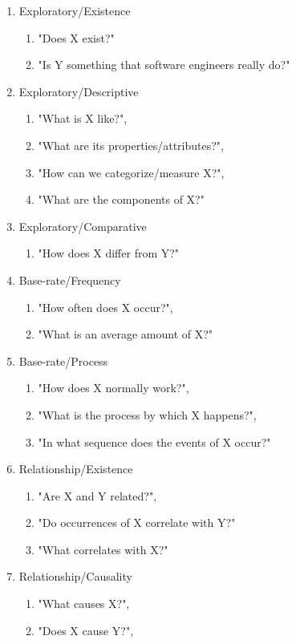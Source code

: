 \documentclass[conference, compsoc, twoside]{IEEEtran}
\begin{document}
\begin{enumerate}
	\item Exploratory/Existence 
	\begin{enumerate}
		\item "Does X exist?" 
		\item "Is Y something that software engineers really do?"
	\end{enumerate}
	\item Exploratory/Descriptive 
	\begin{enumerate}
		\item "What is X like?",
		\item "What are its properties/attributes?",
		\item "How can we categorize/measure X?",
		\item "What are the components of X?"
	\end{enumerate}
	\item Exploratory/Comparative 
	\begin{enumerate}
		\item "How does X differ from Y?"
	\end{enumerate}
	\item Base-rate/Frequency 
	\begin{enumerate}
		\item "How often does X occur?",
		\item "What is an average amount of X?"
	\end{enumerate}
	\item Base-rate/Process 
	\begin{enumerate}
		\item "How does X normally work?",
		\item "What is the process by which X happens?",
		\item "In what sequence does the events of X occur?"
	\end{enumerate}
	\item Relationship/Existence 
	\begin{enumerate}
		\item "Are X and Y related?",
		\item "Do occurrences of X correlate with Y?"
		\item "What correlates with X?"
	\end{enumerate}
	\item Relationship/Causality 
	\begin{enumerate}
		\item "What causes X?",
		\item "Does X cause Y?",

\end{enumerate}
\end{enumerate}
\end{document}
